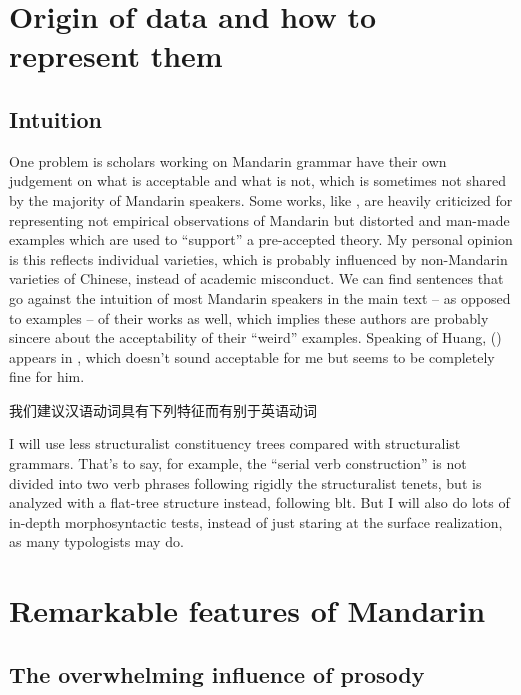 \documentclass[UTF8, a4paper, oneside, scheme=plain, 12pt]{ctexrep}
\begin{document}
\section{Origin of data and how to represent them}

\subsection{Intuition}

One problem is scholars working on Mandarin grammar 
have their own judgement on what is acceptable and what is not, 
which is sometimes not shared by the majority of Mandarin speakers.
Some works, like \citet{huang2013}, 
are heavily criticized for 
representing not empirical observations of Mandarin
but distorted and man-made examples 
which are used to ``support'' a pre-accepted theory.
My personal opinion is this reflects individual varieties, 
which is probably influenced by non-Mandarin varieties of Chinese,
instead of academic misconduct.
We can find sentences that go against the intuition of most Mandarin speakers 
in the main text -- as opposed to examples -- of their works as well, 
which implies these authors are probably 
sincere about the acceptability of their ``weird'' examples.
Speaking of Huang, () appears in \citet{huang2007},
which doesn't sound acceptable for me but seems to be completely fine for him.

\begin{exe}
    \ex\label{ex:weird-1} 我们建议汉语动词具有下列特征而有别于英语动词 \citep{huang2007}
\end{exe}

I will use less structuralist constituency trees compared with structuralist grammars.
That's to say, for example, 
the ``serial verb construction'' is not divided into two verb phrases 
following rigidly the structuralist tenets,
but is analyzed with a flat-tree structure instead,
following \acs{blt}.
But I will also do lots of in-depth morphosyntactic tests,
instead of just staring at the surface realization,
as many typologists may do.


\section{Remarkable features of Mandarin}

\subsection{The overwhelming influence of prosody}
\end{document}
